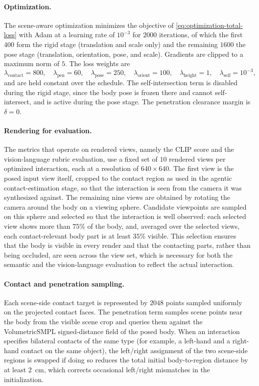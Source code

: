 \paragraph{Optimization.} The scene-aware optimization minimizes the objective of \cref{eq:optimization-total-loss} with Adam at a learning rate of $10^{-3}$ for $2000$ iterations, of which the first $400$ form the rigid stage (translation and scale only) and the remaining $1600$ the pose stage (translation, orientation, pose, and scale). Gradients are clipped to a maximum norm of $5$. The loss weights are
\begin{equation*}
\lambda_{\mathrm{contact}} = 800, \quad
\lambda_{\mathrm{pen}} = 60, \quad
\lambda_{\mathrm{pose}} = 250, \quad
\lambda_{\mathrm{orient}} = 100, \quad
\lambda_{\mathrm{height}} = 1, \quad
\lambda_{\mathrm{self}} = 10^{-3},
\end{equation*}
and are held constant over the schedule. The self-intersection term is disabled during the rigid stage, since the body pose is frozen there and cannot self-intersect, and is active during the pose stage. The penetration clearance margin is $\delta = 0$.

\paragraph{Rendering for evaluation.} The metrics that operate on rendered views, namely the CLIP score and the vision-language rubric evaluation, use a fixed set of $10$ rendered views per optimized interaction, each at a resolution of $640 \times 640$. The first view is the posed input view itself, cropped to the contact region as used in the agentic contact-estimation stage, so that the interaction is seen from the camera it was synthesized against. The remaining nine views are obtained by rotating the camera around the body on a viewing sphere. Candidate viewpoints are sampled on this sphere and selected so that the interaction is well observed: each selected view shows more than $75\%$ of the body, and, averaged over the selected views, each contact-relevant body part is at least $35\%$ visible. This selection ensures that the body is visible in every render and that the contacting parts, rather than being occluded, are seen across the view set, which is necessary for both the semantic and the vision-language evaluation to reflect the actual interaction.

\paragraph{Contact and penetration sampling.} Each scene-side contact target is represented by $2048$ points sampled uniformly on the projected contact faces. The penetration term samples scene points near the body from the visible scene crop and queries them against the VolumetricSMPL signed-distance field of the posed body. When an interaction specifies bilateral contacts of the same type (for example, a left-hand and a right-hand contact on the same object), the left/right assignment of the two scene-side regions is swapped if doing so reduces the total initial body-to-region distance by at least $2$~cm, which corrects occasional left/right mismatches in the initialization.


